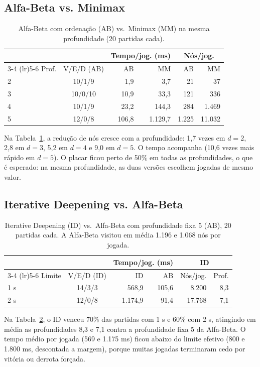 \documentclass[letterpaper]{article} %
\begin{document}
\subsection{Alfa-Beta vs. Minimax}
\begin{table}[t]
\centering
\setlength{\tabcolsep}{4pt}
\begin{tabular}{lcrrrr}
\toprule
 & & \multicolumn{2}{c}{Tempo/jog. (ms)} & \multicolumn{2}{c}{Nós/jog.} \\
\cmidrule(lr){3-4} \cmidrule(lr){5-6}
Prof. & V/E/D (AB) & AB & MM & AB & MM \\
\midrule
2 & 10/1/9 & 1,9 & 3,7 & 21 & 37 \\
3 & 10/0/10 & 10,9 & 33,3 & 121 & 336 \\
4 & 10/1/9 & 23,2 & 144,3 & 284 & 1.469 \\
5 & 12/0/8 & 106,8 & 1.129,7 & 1.225 & 11.032 \\
\bottomrule
\end{tabular}
\caption{Alfa-Beta com ordenação (AB) vs.\ Minimax (MM) na mesma profundidade (20 partidas cada).}
\label{tab:ab-minimax}
\end{table}
Na Tabela~\ref{tab:ab-minimax}, a redução de nós cresce com a profundidade: 1,7 vezes em $d=2$, 2,8 em $d=3$, 5,2 em $d=4$ e 9,0 em $d=5$. O tempo acompanha (10,6 vezes mais rápido em $d=5$). O placar ficou perto de 50\% em todas as profundidades, o que é esperado: na mesma profundidade, as duas versões escolhem jogadas de mesmo valor.

\subsection{Iterative Deepening vs. Alfa-Beta}
\begin{table}[t]
\centering
\setlength{\tabcolsep}{4pt}
\begin{tabular}{lcrrrr}
\toprule
 & & \multicolumn{2}{c}{Tempo/jog. (ms)} & \multicolumn{2}{c}{ID} \\
\cmidrule(lr){3-4} \cmidrule(lr){5-6}
Limite & V/E/D (ID) & ID & AB & Nós/jog. & Prof. \\
\midrule
1 s & 14/3/3 & 568,9 & 105,6 & 8.200 & 8,3 \\
2 s & 12/0/8 & 1.174,9 & 91,4 & 17.768 & 7,1 \\
\bottomrule
\end{tabular}
\caption{Iterative Deepening (ID) vs.\ Alfa-Beta com profundidade fixa 5 (AB), 20 partidas cada. A Alfa-Beta visitou em média 1.196 e 1.068 nós por jogada.}
\label{tab:id-ab}
\end{table}
Na Tabela~\ref{tab:id-ab}, o ID venceu 70\% das partidas com 1 s e 60\% com 2 s, atingindo em média as profundidades 8,3 e 7,1 contra a profundidade fixa 5 da Alfa-Beta. O tempo médio por jogada (569 e 1.175 ms) ficou abaixo do limite efetivo (800 e 1.800 ms, descontada a margem), porque muitas jogadas terminaram cedo por vitória ou derrota forçada.
\end{document}
